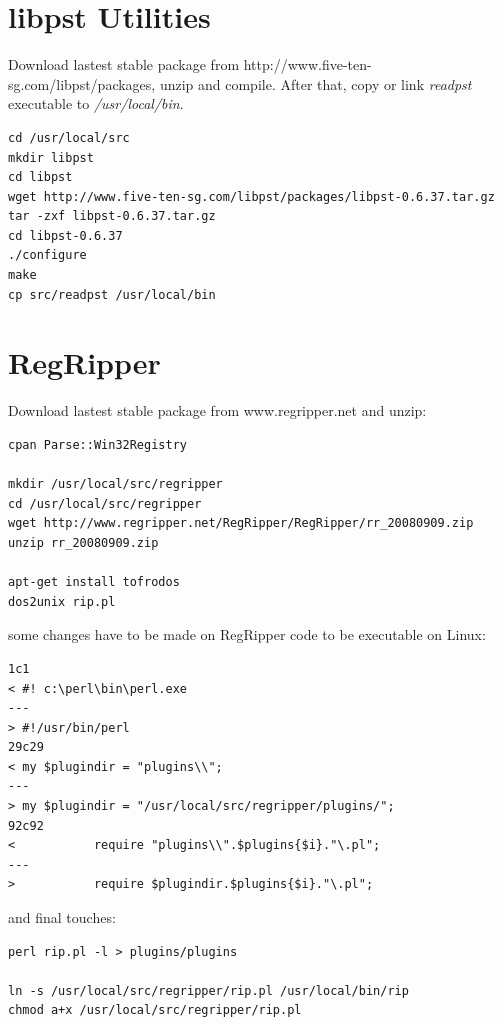 \documentclass[a4paper,11pt,oneside]{report}
\begin{document}
\section{libpst Utilities} \label{anx:libpst}

Download lastest stable package from http://www.five-ten-sg.com/libpst/packages, unzip and compile. After that, copy or link \emph{readpst} executable to \emph{/usr/local/bin}.

\begin{verbatim}
cd /usr/local/src
mkdir libpst
cd libpst
wget http://www.five-ten-sg.com/libpst/packages/libpst-0.6.37.tar.gz
tar -zxf libpst-0.6.37.tar.gz
cd libpst-0.6.37
./configure
make
cp src/readpst /usr/local/bin
\end{verbatim}



\section{RegRipper} \label{anx:regripper}

Download lastest stable package from www.regripper.net and unzip:

\begin{verbatim}
cpan Parse::Win32Registry

mkdir /usr/local/src/regripper
cd /usr/local/src/regripper
wget http://www.regripper.net/RegRipper/RegRipper/rr_20080909.zip
unzip rr_20080909.zip

apt-get install tofrodos
dos2unix rip.pl
\end{verbatim}


some changes have to be made on RegRipper code to be executable on Linux:

\begin{verbatim}
1c1
< #! c:\perl\bin\perl.exe
---
> #!/usr/bin/perl
29c29
< my $plugindir = "plugins\\";
---
> my $plugindir = "/usr/local/src/regripper/plugins/";
92c92
< 			require "plugins\\".$plugins{$i}."\.pl";
---
> 			require $plugindir.$plugins{$i}."\.pl";
\end{verbatim}

and final touches:

\begin{verbatim}
perl rip.pl -l > plugins/plugins

ln -s /usr/local/src/regripper/rip.pl /usr/local/bin/rip
chmod a+x /usr/local/src/regripper/rip.pl
\end{verbatim}
\end{document}
